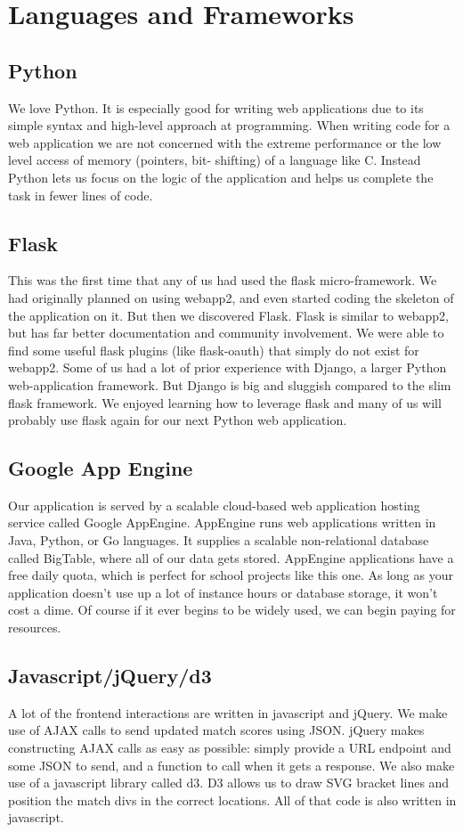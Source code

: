 \documentclass{article}
\begin{document}
\newpage
\section{Languages and Frameworks}
\subsection{Python}
We love Python. It is especially good for writing web applications due to its simple syntax and high-level approach at programming. When writing code for a web application we are not concerned with the extreme performance or the low level access of memory (pointers, bit- shifting) of a language like C. Instead Python lets us focus on the logic of the application and helps us complete the task in fewer lines of code.

\subsection{Flask}
This was the first time that any of us had used the flask micro-framework. We had originally planned on using webapp2, and even started coding the skeleton of the application on it. But then we discovered Flask. Flask is similar to webapp2, but has far better documentation and community involvement. We were able to find some useful flask plugins (like flask-oauth) that simply do not exist for webapp2. Some of us had a lot of prior experience with Django, a larger Python web-application framework. But Django is big and sluggish compared to the slim flask framework. We enjoyed learning how to leverage flask and many of us will probably use flask again for our next Python web application.

\subsection{Google App Engine}
Our application is served by a scalable cloud-based web application hosting service called Google AppEngine. AppEngine runs web applications written in Java, Python, or Go languages. It supplies a scalable non-relational database called BigTable, where all of our data gets stored. AppEngine applications have a free daily quota, which is perfect for school projects like this one. As long as your application doesn’t use up a lot of instance hours or database storage, it won’t cost a dime. Of course if it ever begins to be widely used, we can begin paying for resources.

\subsection{Javascript/jQuery/d3}
A lot of the frontend interactions are written in javascript and jQuery. We make use of AJAX calls to send updated match scores using JSON. jQuery makes constructing AJAX calls as easy as possible: simply provide a URL endpoint and some JSON to send, and a function to call when it gets a response. We also make use of a javascript library called d3. D3 allows us to draw SVG bracket lines and position the match divs in the correct locations. All of that code is also written in javascript.
\end{document}
